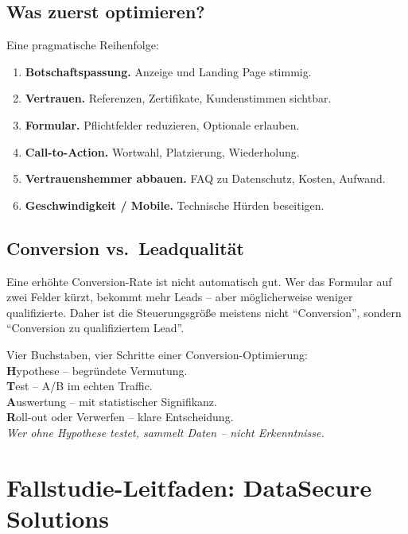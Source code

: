 \documentclass[11pt,a4paper,oneside]{article}
\newcommand{\caveatfontfallback}{\itshape}
\newcommand\caveatfont{\caveatfontfallback}%
\newcommand{\akzent}[1]{{\caveatfont\color{lpAmber}#1}}
\begin{document}
\subsection{Was zuerst optimieren?}

Eine pragmatische Reihenfolge:

\begin{enumerate}
  \item \textbf{Botschaftspassung.} Anzeige und Landing Page stimmig.
  \item \textbf{Vertrauen.} Referenzen, Zertifikate, Kundenstimmen sichtbar.
  \item \textbf{Formular.} Pflichtfelder reduzieren, Optionale erlauben.
  \item \textbf{Call-to-Action.} Wortwahl, Platzierung, Wiederholung.
  \item \textbf{Vertrauenshemmer abbauen.} FAQ zu Datenschutz, Kosten, Aufwand.
  \item \textbf{Geschwindigkeit / Mobile.} Technische Hürden beseitigen.
\end{enumerate}

\subsection{Conversion vs.\ Leadqualität}

Eine erhöhte Conversion-Rate ist nicht automatisch gut. Wer das Formular auf zwei Felder kürzt, bekommt mehr Leads -- aber möglicherweise weniger qualifizierte. Daher ist die Steuerungsgröße meistens nicht ``Conversion'', sondern ``Conversion zu qualifiziertem Lead''.

\begin{eselsbox}[Eselsbrücke: \akzent{H-T-A-R}]
Vier Buchstaben, vier Schritte einer Conversion-Optimierung:\\[2pt]
\textbf{H}ypothese -- begründete Vermutung.\\
\textbf{T}est -- A/B im echten Traffic.\\
\textbf{A}uswertung -- mit statistischer Signifikanz.\\
\textbf{R}oll-out oder Verwerfen -- klare Entscheidung.\\[2pt]
\emph{Wer ohne Hypothese testet, sammelt Daten -- nicht Erkenntnisse.}
\end{eselsbox}

\section{Fallstudie-Leitfaden: DataSecure Solutions}
\end{document}
